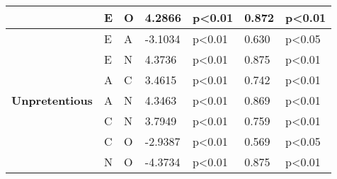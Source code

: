 \begin{longtable}{ |p{2.5cm}| p{0.5cm}|p{0.5cm}|p{1.3cm}| p{1.7cm}|p{1cm}|p{1.7cm}|  }
    &E		&O			&4.2866			&p<0.01			&0.872 		&p<0.01\\
    \hline
    \hline
    \multirow{7}{*}{\textbf{Unpretentious}}
    &E		&A			&-3.1034			&p<0.01			& 0.630  		&p<0.05\\
    &E		&N			&4.3736			&p<0.01			& 0.875		&p<0.01\\
    &A		&C			&3.4615			&p<0.01			& 0.742		&p<0.01\\
    &A		&N			&4.3463			&p<0.01			& 0.869 		&p<0.01\\
    &C		&N			&3.7949			&p<0.01			& 0.759		&p<0.01\\
    &C		&O			&-2.9387			&p<0.01			& 0.569 		&p<0.05\\
    &N		&O			&-4.3734			&p<0.01			& 0.875		&p<0.01\\
    \hline
\end{longtable}

